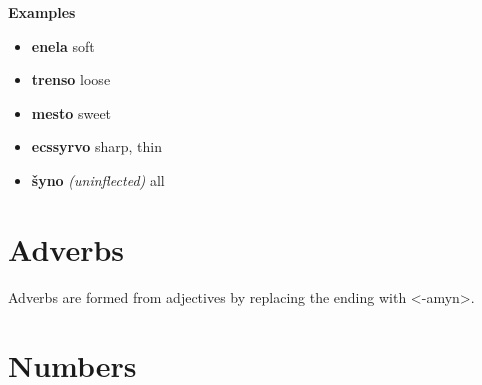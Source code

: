 \documentclass{book}
\begin{document}
\textbf{Examples}

\begin{itemize}
  \item \textbf{enela} soft
  \item \textbf{trenso} loose
  \item \textbf{mesto} sweet
  \item \textbf{ecssyrvo} sharp, thin
  \item \textbf{šyno} \emph{(uninflected)} all
\end{itemize}

\section{Adverbs}

Adverbs are formed from adjectives by replacing the ending with <-amyn>.

\section{Numbers}
\end{document}
